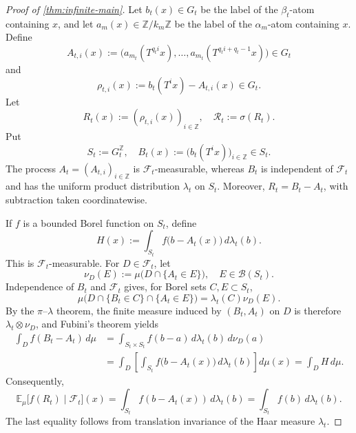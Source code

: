 \documentclass[10pt,a4paper]{amsart}
\newcommand{\Z}{\mathbb Z}
\newcommand{\cB}{\mathcal B}
\newcommand{\cF}{\mathcal F}
\newcommand{\cR}{\mathcal R}
\numberwithin{equation}{section}
\begin{document}
\begin{proof}[Proof of \cref{thm:infinite-main}]
		
		Let
		$b_t(x)\in G_t$ be the label of the $\beta_t$-atom containing $x$, and
		let $a_m(x)\in\Z/k_m\Z$ be the label of the $\alpha_m$-atom containing $x$.
		Define
		\[
		A_{t,i}(x)
		:=
		\bigl(
		a_{m_t}(T^{q_ti}x),\ldots,
		a_{m_t}(T^{q_ti+q_t-1}x)
		\bigr)\in G_t
		\]
		and
		\[
		\rho_{t,i}(x):=b_t(T^ix)-A_{t,i}(x)\in G_t.
		\]
		Let
		\[
		R_t(x):=(\rho_{t,i}(x))_{i\in\Z},
		\quad
		\cR_t:=\sigma(R_t).
		\]
		Put
		\[
		S_t:=G_t^\Z,
		\quad
		B_t(x):=\bigl(b_t(T^ix)\bigr)_{i\in\Z}\in S_t.
		\]
		The process $A_t=(A_{t,i})_{i\in\Z}$ is $\cF_t$-measurable, whereas
		$B_t$ is independent of $\cF_t$ and has the uniform product distribution
		$\lambda_t$ on $S_t$.  Moreover, $R_t=B_t-A_t$, with subtraction taken
		coordinatewise.
		
		If $f$ is a bounded Borel
		function on $S_t$, define
		\[
		H(x):=\int_{S_t}f\bigl(b-A_t(x)\bigr)\,d\lambda_t(b).
		\]
		This is $\cF_t$-measurable.  For $D\in\cF_t$, let
		\[
		\nu_D(E):=\mu\bigl(D\cap\{A_t\in E\}\bigr),
		\quad E\in\cB(S_t).
		\]
		Independence of $B_t$ and $\cF_t$ gives, for Borel sets $C,E\subset S_t$,
		\[
		\mu\bigl(D\cap\{B_t\in C\}\cap\{A_t\in E\}\bigr)
		=
		\lambda_t(C)\nu_D(E).
		\]
		By the $\pi$--$\lambda$ theorem, the finite measure induced by
		$(B_t,A_t)$ on $D$ is therefore $\lambda_t\otimes\nu_D$, and Fubini's
		theorem yields
		\[
		\begin{aligned}
			\int_D f(B_t-A_t)\,d\mu
			&=
			\int_{S_t\times S_t}f(b-a)\,d\lambda_t(b)\,d\nu_D(a)\\
			&=
			\int_D\left[\int_{S_t}f\bigl(b-A_t(x)\bigr)\,d\lambda_t(b)\right]d\mu(x)
			=
			\int_DH\,d\mu.
		\end{aligned}
		\]
		Consequently,
		\[
		\mathbb E_\mu\bigl[f(R_t)\mid\cF_t\bigr](x)
		=
		\int_{S_t} f(b-A_t(x))\,d\lambda_t(b)
		=
		\int_{S_t} f(b)\,d\lambda_t(b).
		\]
		The last equality follows from translation invariance of the Haar
		measure $\lambda_t$.
		

\end{proof}
\end{document}
